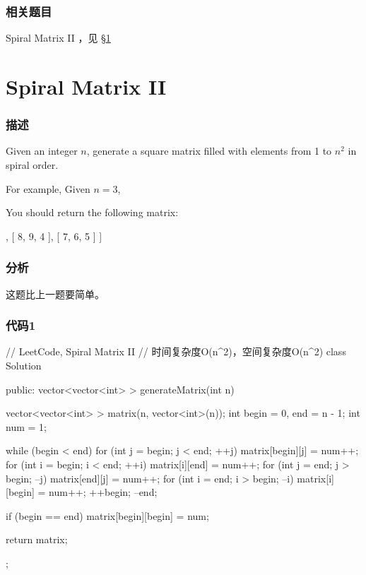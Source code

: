 \subsubsection{相关题目}
\begindot
\item Spiral Matrix II ，见 \S \ref{sec:spiral-matrix-ii}
\myenddot


\section{Spiral Matrix II} %
\label{sec:spiral-matrix-ii}


\subsubsection{描述}
Given an integer $n$, generate a square matrix filled with elements from 1 to $n^2$ in spiral order.

For example,
Given $n = 3$,

You should return the following matrix:
\begin{Code}
[
 [ 1, 2, 3 ],
 [ 8, 9, 4 ],
 [ 7, 6, 5 ]
]
\end{Code}


\subsubsection{分析}
这题比上一题要简单。


\subsubsection{代码1}
\begin{Code}
// LeetCode, Spiral Matrix II
// 时间复杂度O(n^2)，空间复杂度O(n^2)
class Solution {
public:
    vector<vector<int> > generateMatrix(int n) {
        vector<vector<int> > matrix(n, vector<int>(n));
        int begin = 0, end = n - 1;
        int num = 1;

        while (begin < end) {
            for (int j = begin; j < end; ++j) matrix[begin][j] = num++;
            for (int i = begin; i < end; ++i) matrix[i][end] = num++;
            for (int j = end; j > begin; --j) matrix[end][j] = num++;
            for (int i = end; i > begin; --i) matrix[i][begin] = num++;
            ++begin;
            --end;
        }

        if (begin == end) matrix[begin][begin] = num;

        return matrix;
    }
};
\end{Code}


